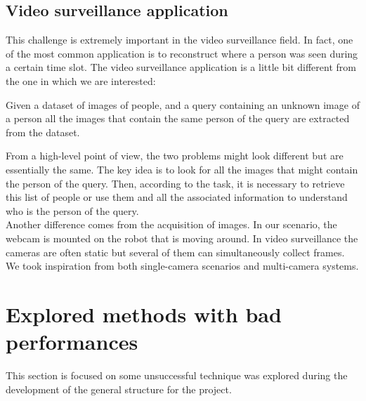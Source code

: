 \subsection{Video surveillance application}
This challenge is extremely important in the video surveillance field. In fact, one of the most common application is to reconstruct where a person was seen during a certain time slot. The video surveillance application is a little bit different from the one in which we are interested:
\begin{tcolorbox}
	\begin{center}
		Given a dataset of images of people, and a query containing an unknown image of a person all the images that contain the same person of the query are extracted from the dataset.
	\end{center}
\end{tcolorbox}
From a high-level point of view, the two problems might look different but are essentially the same. The key idea is to look for all the images that might contain the person of the query. Then, according to the task, it is necessary to retrieve this list of people or use them and all the associated information to understand who is the person of the query.\\
Another difference comes from the acquisition of images. In our scenario, the webcam is mounted on the robot that is moving around. In video surveillance the cameras are often static but several of them can simultaneously collect frames. We took inspiration from both single-camera scenarios\cite{reID_withSSN} and multi-camera systems\cite{multiFeatures_reID}.


\section{Explored methods with bad performances}
This section is focused on some unsuccessful technique was explored during the development of the general structure for the project.

